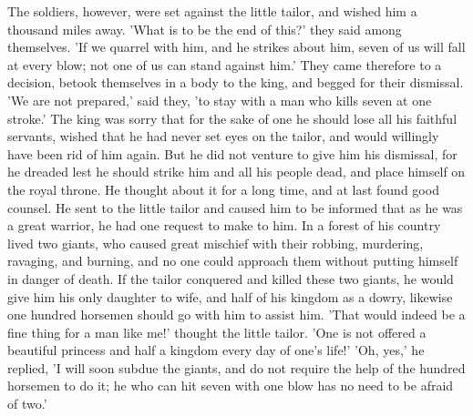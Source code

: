 \documentclass[12pt]{book}
\begin{document}
The soldiers, however, were set against the little tailor, and wished
him a thousand miles away. 'What is to be the end of this?' they said
among themselves. 'If we quarrel with him, and he strikes about him,
seven of us will fall at every blow; not one of us can stand against
him.' They came therefore to a decision, betook themselves in a body
to the king, and begged for their dismissal. 'We are not prepared,'
said they, 'to stay with a man who kills seven at one stroke.' The
king was sorry that for the sake of one he should lose all his
faithful servants, wished that he had never set eyes on the tailor,
and would willingly have been rid of him again. But he did not venture
to give him his dismissal, for he dreaded lest he should strike him
and all his people dead, and place himself on the royal throne. He
thought about it for a long time, and at last found good counsel. He
sent to the little tailor and caused him to be informed that as he was
a great warrior, he had one request to make to him. In a forest of his
country lived two giants, who caused great mischief with their
robbing, murdering, ravaging, and burning, and no one could approach
them without putting himself in danger of death. If the tailor
conquered and killed these two giants, he would give him his only
daughter to wife, and half of his kingdom as a dowry, likewise one
hundred horsemen should go with him to assist him. 'That would indeed
be a fine thing for a man like me!' thought the little tailor. 'One is
not offered a beautiful princess and half a kingdom every day of one's
life!' 'Oh, yes,' he replied, 'I will soon subdue the giants, and do
not require the help of the hundred horsemen to do it; he who can hit
seven with one blow has no need to be afraid of two.'
\end{document}
